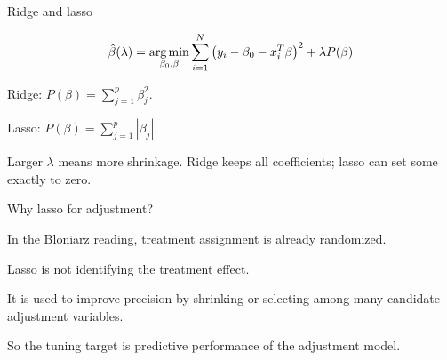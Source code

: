 \documentclass[xcolor={table}, handout]{beamer}
\begin{document}

\begin{frame}{Ridge and lasso}

\[
\hat \beta(\lambda) = \operatorname*{{\textrm {arg} }\,\!\min}_{\beta_0, \beta} \sum_{i=1}^N \left(y_i - \beta_0 - x_i^T\beta\right)^2 + \lambda P(\beta)
\]
\pause

\begin{wideitemize}
\item Ridge: $P(\beta) = \sum_{j=1}^p \beta_j^2$. \pause
\item Lasso: $P(\beta) = \sum_{j=1}^p |\beta_j|$. \pause
\item Larger $\lambda$ means more shrinkage. Ridge keeps all coefficients; lasso can set some exactly to zero.
\end{wideitemize}
\hfill \cite{hastie2009elements}

\end{frame}



\begin{frame}{Why lasso for adjustment?}

\begin{wideitemize}
\item In the Bloniarz reading, treatment assignment is already randomized. \pause
\item Lasso is not identifying the treatment effect. \pause
\item It is used to improve precision by shrinking or selecting among many candidate adjustment variables. \pause
\item So the tuning target is predictive performance of the adjustment model.
\end{wideitemize}

\end{frame}
\end{document}
